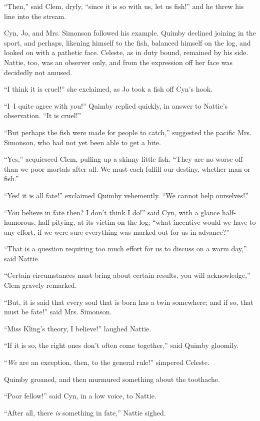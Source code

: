 ``Then,'' said Clem, dryly, ``since it is so with us, let us fish!'' and he
threw his line into the stream.

Cyn, Jo, and Mrs. Simonson followed his example. Quimby declined joining
in the sport, and perhaps, likening himself to the fish, balanced
himself on the log, and looked on with a pathetic face. Celeste, as in
duty bound, remained by his side. Nattie, too, was an observer only, and
from the expression off her face was decidedly not amused.

``I think it is cruel!'' she exclaimed, as Jo took a fish off Cyn's hook.

``I--I quite agree with you!'' Quimby replied quickly, in answer to
Nattie's observation. ``It is cruel!''

``But perhaps the fish were made for people to catch,'' suggested the
pacific Mrs. Simonson, who had not yet been able to get a bite.

``Yes,'' acquiesced Clem, pulling up a skinny little fish. ``They are no
worse off than we poor mortals after all. We must each fulfill our
destiny, whether man or fish.''

``Yes! it is all fate!'' exclaimed Quimby vehemently. ``We cannot help
ourselves!''

``You believe in fate then? I don't think I do!'' said Cyn, with a glance
half-humorous, half-pitying, at its victim on the log; ``what incentive
would we have to any effort, if we were sure everything was marked out
for us in advance?''

``That is a question requiring too much effort for us to discuss on a
warm day,'' said Nattie.

``Certain circumstances must bring about certain results, you will
acknowledge,'' Clem gravely remarked.

``But, it is said that every soul that is born has a twin somewhere; and
if so, that must be fate!'' said Mrs. Simonson.

``Miss Kling's theory, I believe!'' laughed Nattie.

``If it is so, the right ones don't often come together,'' said Quimby
gloomily.

``\emph{We} are an exception, then, to the general rule!'' simpered Celeste.

Quimby groaned, and then murmured something about the toothache.

``Poor fellow!'' said Cyn, in a low voice, to Nattie.

``After all, there \emph{is} something in fate,'' Nattie sighed.

